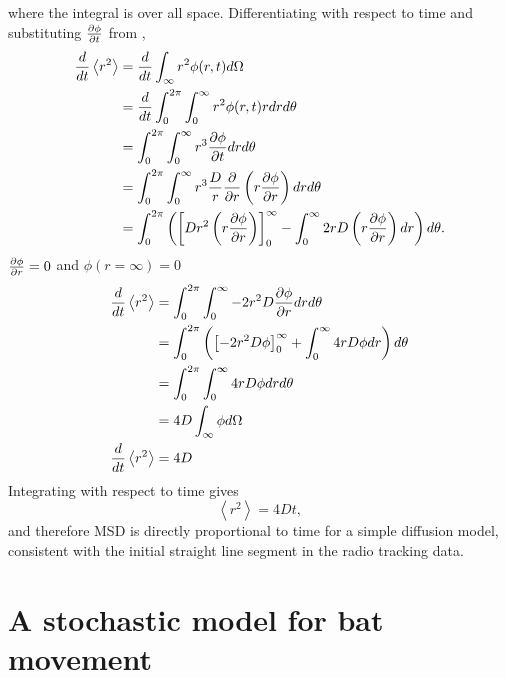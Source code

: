 %
where the integral is over all space.
%
Differentiating  with respect to time and substituting $\frac{\partial \phi}{\partial t}$ from ,
%
\begin{equation}
\begin{split}
\frac{d}{dt} \left<r^2\right> &= \frac{d}{dt}\int_{\infty}r^2 \phi(r,t) d\Omega \\
                            &= \frac{d}{dt} \int_0^{2\pi}\int_0^{\infty} r^2 \phi(r,t) r dr d\theta \\
                           &= \int_0^{2\pi} \int_0^{\infty} r^3 \frac{\partial \phi}{\partial t} dr d\theta \\
                            &= \int_0^{2\pi} \int_0^{\infty} r^3 \frac{D}{r} \frac{\partial }{\partial r } \left( r \frac{\partial  \phi}{\partial  r}\right) dr d\theta \\
                            &= \int_0^{2\pi} \left( \left[ D r^2 \left( r \frac{\partial  \phi}{\partial  r}\right) \right]_0^{\infty} - \int_0^{\infty} 2rD \left(r \frac{\partial \phi}{\partial r} \right) dr \right) d\theta. \\
\label{eqn:diffusion_1}
\end{split}
\end{equation}
%
$\frac{\partial \phi}{\partial r} = 0$ and $\phi(r=\infty)=0$
%
\begin{equation}
\begin{split}
\frac{d}{dt} \left<r^2\right> &= \int_0^{2\pi} \int_0^{\infty} -2r^2D \frac{\partial  \phi}{\partial r}dr d\theta \\
                            &= \int_0^{2\pi} \left( \left[-2r^2D \phi \right]_0^{\infty} + \int_0^{\infty} 4rD \phi dr \right)d\theta \\
                            &= \int_0^{2\pi} \int_0^{\infty} 4rD\phi dr d\theta \\
                            &= 4D \int_{\infty} \phi d\Omega \\
\frac{d}{dt} \left<r^2\right>  &= 4D \\
\label{eqn:diffusion_1}
\end{split}
\end{equation}
Integrating with respect to time gives
%
\begin{equation}
\left<r^2\right> = 4Dt ,
\label{eqn:D_msd}
\end{equation}
%
and therefore MSD is directly proportional to time for a simple diffusion model, consistent with the initial straight line segment in the radio tracking data.

\section{A stochastic model for bat movement}

